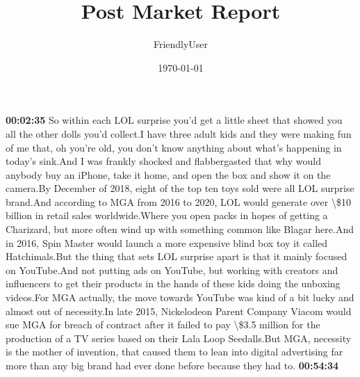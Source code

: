 \documentclass{article}%
\title{Post Market Report}%
\author{FriendlyUser}%
\date{\today}%
\begin{document}
%
\normalsize%
\textbf{00:02:35}%
\newline%
So within each LOL surprise you'd get a little sheet that showed you all the other dolls you'd collect.I have three adult kids and they were making fun of me that, oh you're old, you don't know anything about what's happening in today's sink.And I was frankly shocked and flabbergasted that why would anybody buy an iPhone, take it home, and open the box and show it on the camera.By December of 2018, eight of the top ten toys sold were all LOL surprise brand.And according to MGA from 2016 to 2020, LOL would generate over \textbackslash{}\$10 billion in retail sales worldwide.Where you open packs in hopes of getting a Charizard, but more often wind up with something common like Blagar here.And in 2016, Spin Master would launch a more expensive blind box toy it called Hatchimals.But the thing that sets LOL surprise apart is that it mainly focused on YouTube.And not putting ads on YouTube, but working with creators and influencers to get their products in the hands of these kids doing the unboxing videos.For MGA actually, the move towards YouTube was kind of a bit lucky and almost out of necessity.In late 2015, Nickelodeon Parent Company Viacom would sue MGA for breach of contract after it failed to pay \textbackslash{}\$3.5 million for the production of a TV series based on their Lala Loop Seedalls.But MGA, necessity is the mother of invention, that caused them to lean into digital advertising far more than any big brand had ever done before because they had to.%
\textbf{00:54:34}%
\newline%
\end{document}
